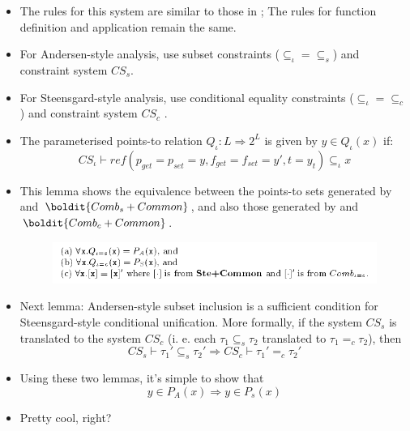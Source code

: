 \documentclass{beamer}
\begin{document}
\begin{frame}[allowframebreaks]

  \begin{itemize}
  \item The rules for this system are similar to those in
    ; The rules for function definition and application
    remain the same.
  \item For Andersen-style analysis, use subset constraints
    ($\subseteq_{\iota} = \subseteq_s$) and constraint system $CS_s$.
  \item For Steensgard-style analysis, use conditional equality
    constraints ($\subseteq_{\iota} = \subseteq_c$) and constraint
    system $CS_c$ .
  \item The parameterised points-to relation $Q_{\iota} : L
    \Rightarrow 2^L $ is given by $y \in Q_{\iota}(x)$ if:
    $$ CS_{\iota} \vdash ref(p_{get}=p_{set}=y, f_{get}=f_{set}=y',
    t=y_t) \subseteq_{\iota} x $$
  \item This lemma shows the equivalence between the points-to sets
    generated by  and $\boldit{Comb_{s} + Common}$,
    and also those generated by  and
    $\boldit{Comb_{c}+Common}$.
    \begin{figure}
      \centering
      \includegraphics[scale=0.3]{lemma_7_2.png}
    \end{figure}
  \item Next lemma: Andersen-style subset inclusion
    is a sufficient condition for Steensgard-style conditional
    unification. More formally, if the system $CS_s$ is translated to
    the system $CS_c$ (i. e. each $\tau_1 \subseteq_s \tau_2$
    translated to $\tau_1 =_c \tau_2$), then
    $$ CS_s \vdash \tau_1' \subseteq_s \tau_2' \Rightarrow CS_c \vdash \tau_1' =_c \tau_2' $$
  \item Using these two lemmas, it's simple to show that $$ y \in
    P_A(x) \Rightarrow y \in P_s(x) $$
  \item Pretty cool, right?

  \end{itemize}

\end{frame}
\end{document}
